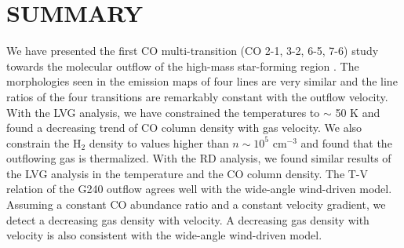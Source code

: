 \section{SUMMARY}\label{summary}

We have presented the first CO multi-transition (CO 2-1, 3-2, 6-5, 7-6) study towards the molecular outflow of the high-mass star-forming region . The morphologies seen in the emission maps of four lines are very similar and the line ratios of the four transitions are remarkably constant with the outflow velocity.  With the LVG analysis, we have constrained the temperatures to $\sim$ 50 K and found a decreasing trend of CO column density with gas velocity. We also constrain the H$_2$ density to values higher than $n \sim 10^5$ cm$^{-3}$ and found that the outflowing gas is thermalized. With the RD analysis, we found similar results of the LVG analysis in the temperature and the CO column density. The T-V relation of the G240 outflow agrees well with the wide-angle wind-driven model. Assuming a constant CO abundance ratio and a constant velocity gradient, we detect a decreasing gas density with velocity. A decreasing gas density with velocity is also consistent with the wide-angle wind-driven model. 
